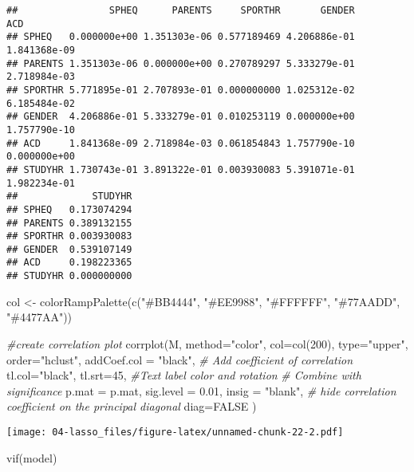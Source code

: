 \documentclass[]{ctexbook}
\newenvironment{Shaded}{\begin{snugshade}}{\end{snugshade}}
\newcommand{\AttributeTok}[1]{\textcolor[rgb]{0.77,0.63,0.00}{#1}}
\newcommand{\CommentTok}[1]{\textcolor[rgb]{0.56,0.35,0.01}{\textit{#1}}}
\newcommand{\ConstantTok}[1]{\textcolor[rgb]{0.00,0.00,0.00}{#1}}
\newcommand{\DecValTok}[1]{\textcolor[rgb]{0.00,0.00,0.81}{#1}}
\newcommand{\FloatTok}[1]{\textcolor[rgb]{0.00,0.00,0.81}{#1}}
\newcommand{\FunctionTok}[1]{\textcolor[rgb]{0.00,0.00,0.00}{#1}}
\newcommand{\NormalTok}[1]{#1}
\newcommand{\OtherTok}[1]{\textcolor[rgb]{0.56,0.35,0.01}{#1}}
\newcommand{\StringTok}[1]{\textcolor[rgb]{0.31,0.60,0.02}{#1}}
\begin{document}
\begin{verbatim}
##                SPHEQ      PARENTS     SPORTHR       GENDER          ACD
## SPHEQ   0.000000e+00 1.351303e-06 0.577189469 4.206886e-01 1.841368e-09
## PARENTS 1.351303e-06 0.000000e+00 0.270789297 5.333279e-01 2.718984e-03
## SPORTHR 5.771895e-01 2.707893e-01 0.000000000 1.025312e-02 6.185484e-02
## GENDER  4.206886e-01 5.333279e-01 0.010253119 0.000000e+00 1.757790e-10
## ACD     1.841368e-09 2.718984e-03 0.061854843 1.757790e-10 0.000000e+00
## STUDYHR 1.730743e-01 3.891322e-01 0.003930083 5.391071e-01 1.982234e-01
##             STUDYHR
## SPHEQ   0.173074294
## PARENTS 0.389132155
## SPORTHR 0.003930083
## GENDER  0.539107149
## ACD     0.198223365
## STUDYHR 0.000000000
\end{verbatim}

\begin{Shaded}
\begin{Highlighting}[]
\NormalTok{col }\OtherTok{\textless{}{-}} \FunctionTok{colorRampPalette}\NormalTok{(}\FunctionTok{c}\NormalTok{(}\StringTok{"\#BB4444"}\NormalTok{, }\StringTok{"\#EE9988"}\NormalTok{, }\StringTok{"\#FFFFFF"}\NormalTok{, }
                          \StringTok{"\#77AADD"}\NormalTok{, }\StringTok{"\#4477AA"}\NormalTok{))}

\CommentTok{\#create correlation plot}
\FunctionTok{corrplot}\NormalTok{(M, }\AttributeTok{method=}\StringTok{"color"}\NormalTok{, }\AttributeTok{col=}\FunctionTok{col}\NormalTok{(}\DecValTok{200}\NormalTok{),  }
         \AttributeTok{type=}\StringTok{"upper"}\NormalTok{, }\AttributeTok{order=}\StringTok{"hclust"}\NormalTok{, }
         \AttributeTok{addCoef.col =} \StringTok{"black"}\NormalTok{, }\CommentTok{\# Add coefficient of correlation}
         \AttributeTok{tl.col=}\StringTok{"black"}\NormalTok{, }\AttributeTok{tl.srt=}\DecValTok{45}\NormalTok{, }\CommentTok{\#Text label color and rotation}
         \CommentTok{\# Combine with significance}
         \AttributeTok{p.mat =}\NormalTok{ p.mat, }\AttributeTok{sig.level =} \FloatTok{0.01}\NormalTok{, }\AttributeTok{insig =} \StringTok{"blank"}\NormalTok{, }
         \CommentTok{\# hide correlation coefficient on the principal diagonal}
         \AttributeTok{diag=}\ConstantTok{FALSE}\NormalTok{ )}
\end{Highlighting}
\end{Shaded}

\texttt{[image: 04-lasso\_files/figure-latex/unnamed-chunk-22-2.pdf]}

\begin{Shaded}
\begin{Highlighting}[]
\FunctionTok{vif}\NormalTok{(model)}
\end{Highlighting}
\end{Shaded}
\end{document}

